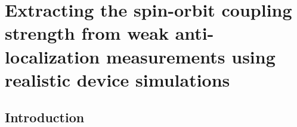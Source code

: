 \chapter{Extracting the spin-orbit coupling strength from weak anti-localization measurements using realistic device simulations}
\label{ch:weakantilocalization}

\newpage
\noindent 
\section{Introduction}

\cite{Beenakker1992} %

